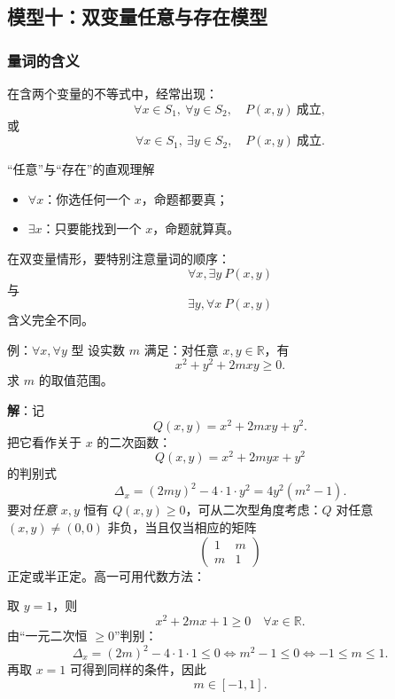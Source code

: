 \documentclass[a4paper,11pt]{ctexart}
\begin{document}
\subsection{模型十：双变量任意与存在模型}

\subsubsection*{量词的含义}

在含两个变量的不等式中，经常出现：
\[
\forall x\in S_1,\ \forall y\in S_2,\quad P(x,y)\ \text{成立},
\]
或
\[
\forall x\in S_1,\ \exists y\in S_2,\quad P(x,y)\ \text{成立}.
\]

\begin{notebox}{“任意”与“存在”的直观理解}
\begin{itemize}
  \item $\forall x$：你选任何一个 $x$，命题都要真；
  \item $\exists x$：只要能找到一个 $x$，命题就算真。
\end{itemize}
在双变量情形，要特别注意量词的顺序：
\[
\forall x,\exists y\ P(x,y)
\]
与
\[
\exists y,\forall x\ P(x,y)
\]
含义完全不同。
\end{notebox}

\begin{examplebox}[mathnote coverage=soft]{例：$\forall x,\forall y$ 型}
设实数 $m$ 满足：对任意 $x,y\in\mathbb{R}$，有
\[
x^2+y^2+2mxy\ge 0.
\]
求 $m$ 的取值范围。

\textbf{解}：记
\[
Q(x,y)=x^2+2mxy+y^2.
\]
把它看作关于 $x$ 的二次函数：
\[
Q(x,y)=x^2+2myx+y^2
\]
的判别式
\[
\Delta_x=(2my)^2-4\cdot 1\cdot y^2=4y^2(m^2-1).
\]
要对\emph{任意} $x,y$ 恒有 $Q(x,y)\ge 0$，可从二次型角度考虑：$Q$ 对任意 $(x,y)\ne(0,0)$ 非负，当且仅当相应的矩阵
\[
\begin{pmatrix} 1 & m\\ m & 1\end{pmatrix}
\]
正定或半正定。高一可用代数方法：

取 $y=1$，则
\[
x^2+2mx+1\ge 0\quad\forall x\in\mathbb{R}.
\]
由“一元二次恒 $\ge0$”判别：
\[
\Delta_x=(2m)^2-4\cdot1\cdot 1\le 0\iff m^2-1\le 0\iff -1\le m\le 1.
\]
再取 $x=1$ 可得到同样的条件，因此
\[
m\in[-1,1].
\]
\end{examplebox}
\end{document}
